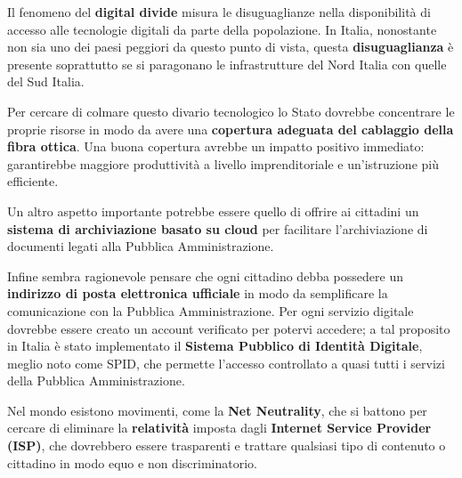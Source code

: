 Il fenomeno del \textbf{digital divide} misura le disuguaglianze nella disponibilità di accesso alle tecnologie digitali da parte della popolazione. In Italia, nonostante non sia uno dei paesi peggiori da questo punto di vista, questa \textbf{disuguaglianza} è presente soprattutto se si paragonano le infrastrutture del Nord Italia con quelle del Sud Italia.

\bigbreak
Per cercare di colmare questo divario tecnologico lo Stato dovrebbe concentrare le proprie risorse in modo da avere una \textbf{copertura adeguata del cablaggio della fibra ottica}. Una buona copertura avrebbe un impatto positivo immediato: garantirebbe maggiore produttività a livello imprenditoriale e un’istruzione più efficiente.

Un altro aspetto importante potrebbe essere quello di offrire ai cittadini un \textbf{sistema di archiviazione basato su cloud} per facilitare l'archiviazione di documenti legati alla Pubblica Amministrazione.

Infine sembra ragionevole pensare che ogni cittadino debba possedere un \textbf{indirizzo di posta elettronica ufficiale} in modo da semplificare la comunicazione con la Pubblica Amministrazione. Per ogni servizio digitale dovrebbe essere creato un account verificato per potervi accedere; a tal proposito in Italia è stato implementato il \textbf{Sistema Pubblico di Identità Digitale}, meglio noto come SPID, che permette l'accesso controllato a quasi tutti i servizi della Pubblica Amministrazione.

\bigbreak
Nel mondo esistono movimenti, come la \textbf{Net Neutrality}, che si battono per cercare di eliminare la \textbf{relatività} imposta dagli \textbf{Internet Service Provider (ISP)}, che dovrebbero essere trasparenti e trattare qualsiasi tipo di contenuto o cittadino in modo equo e non discriminatorio.


